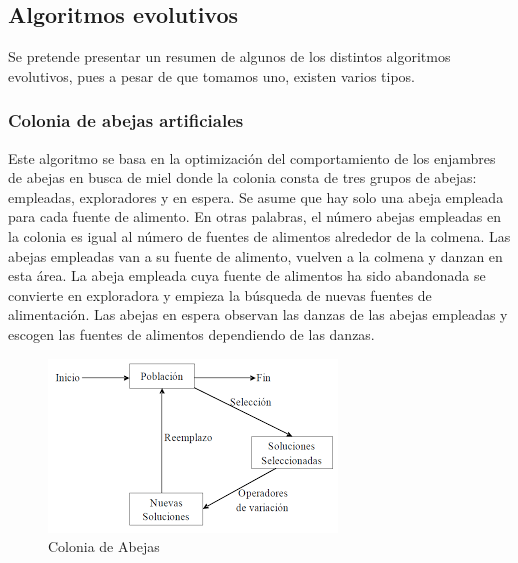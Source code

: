 \documentclass[a4paper,twocolumn,10pt]{article}
\begin{document}


\subsection{Algoritmos evolutivos}
Se pretende presentar un resumen de algunos de los distintos algoritmos evolutivos, pues a pesar de que tomamos uno, existen varios tipos.

\subsubsection*
{Colonia de abejas artificiales}

Este algoritmo se basa en la optimización del comportamiento de los enjambres de abejas en busca de miel donde la colonia consta de tres grupos de abejas: empleadas, exploradores y en espera. Se asume que hay solo una abeja empleada para cada fuente de alimento. En otras palabras, el número abejas empleadas en la colonia es igual al número de fuentes de alimentos alrededor de la colmena. Las abejas empleadas van a su fuente de alimento, vuelven a la colmena y danzan en esta área. La abeja empleada cuya fuente de alimentos ha sido abandonada se convierte en exploradora y empieza la búsqueda de nuevas fuentes de alimentación. Las abejas en espera observan las danzas de las abejas empleadas y escogen las fuentes de alimentos dependiendo de las danzas.
\begin{figure}[h]
    \centering
    \includegraphics[scale=0.45]{abejas.png}
    \caption{Colonia de Abejas}
    \label{fig:mesh1}
\end{figure}
\end{document}
